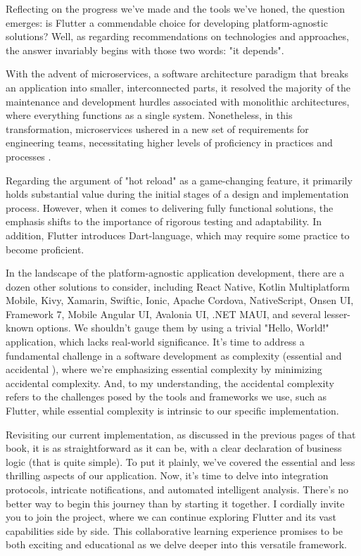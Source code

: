 
Reflecting on the progress we've made and the tools we've honed, the question emerges: is Flutter a commendable 
choice for developing platform-agnostic solutions? Well, as regarding recommendations on technologies and approaches, 
the answer invariably begins with those two words: "it depends".

With the advent of microservices, a software architecture paradigm that breaks an application into smaller, 
interconnected parts, it resolved the majority of the maintenance and development hurdles associated with monolithic 
architectures, where everything functions as a single system. Nonetheless, in this transformation, microservices 
ushered in a new set of requirements for engineering teams, necessitating higher levels of proficiency in practices 
and processes \cite{Mugr23}.

Regarding the argument of "hot reload" as a game-changing feature, it primarily holds substantial value during the 
initial stages of a design and implementation process. However, when it comes to delivering fully functional solutions, 
the emphasis shifts to the importance of rigorous testing and adaptability. In addition, Flutter introduces 
Dart-language, which may require some practice to become proficient.

In the landscape of the platform-agnostic application development, there are a dozen other solutions to consider,
including React Native, Kotlin Multiplatform Mobile, Kivy, Xamarin, Swiftic, Ionic, Apache Cordova, NativeScript,
Onsen UI, Framework 7, Mobile Angular UI, Avalonia UI, .NET MAUI, and several lesser-known options. We shouldn't gauge
them by using a trivial "Hello, World!" application, which lacks real-world significance. It's time to address a
fundamental challenge in a software development as complexity (essential and accidental \cite{Broo87}), where we're
emphasizing essential complexity by minimizing accidental complexity. And, to my understanding, the accidental
complexity refers to the challenges posed by the tools and frameworks we use, such as Flutter, while essential
complexity is intrinsic to our specific implementation.

Revisiting our current implementation, as discussed in the previous pages of that book, it is as 
straightforward as it can be, with a clear declaration of business logic (that is quite simple). To put it plainly, 
we've covered the essential and less thrilling aspects of our application. Now, it's time to delve into integration 
protocols, intricate notifications, and automated intelligent analysis. There's no better way to begin this journey 
than by starting it together. I cordially invite you to join the project, where we can continue exploring Flutter and 
its vast capabilities side by side. This collaborative learning experience promises to be both exciting and educational 
as we delve deeper into this versatile framework.
